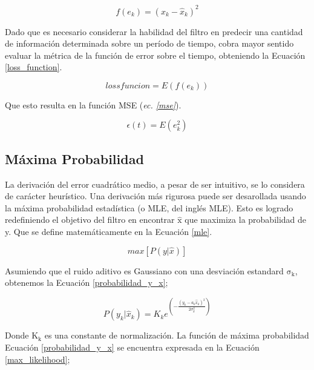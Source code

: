 \documentclass[10pt,a4paper]{article}
\begin{document}
\begin{equation}
    f(e_k) = (x_k - \hat{x}_k)^2 \label{error_cuadratico}
\end{equation}

Dado que es necesario considerar la habilidad del filtro en predecir una
cantidad de informaci\'on determinada sobre un per\'iodo de tiempo, cobra mayor
sentido evaluar la m\'etrica de la funci\'on de error sobre el tiempo,
obteniendo la Ecuaci\'on \ref{loss_function}.

\begin{equation}
    lossfuncion = E\left(f(e_k)\right) \label{loss_function}
\end{equation}

Que esto resulta en la funci\'on \acrshort{MSE} (\emph{ec. \ref{mse}}).

\begin{equation}
    \epsilon(t) = E(e^2_k) \label{mse}
\end{equation}

\subsection{M\'axima Probabilidad}\label{maximum_likelihood_section}

La derivaci\'on del error cuadr\'atico medio, a pesar de ser intuitivo, se lo
considera de car\'acter heur\'istico. Una derivaci\'on m\'as rigurosa puede ser
desarollada usando la m\'axima probabilidad estad\'istica (o \acrshort{MLE}, del
ingl\'es \acrlong{MLE}). Esto es logrado redefiniendo el objetivo del filtro en
encontrar $\mathrm{\hat{x}}$ que maximiza la probabilidad de y. Que se define
matem\'aticamente en la Ecuaci\'on \ref{mle}.

\begin{equation}
    max\left[P\left(y|\hat{x}\right)\right] \label{mle}
\end{equation}

Asumiendo que el ruido aditivo es Gaussiano con una desviaci\'on estandard
$\mathrm{\sigma_k}$, obtenemos la Ecuaci\'on \ref{probabilidad_y_x};

\begin{equation}
    P\left(y_k|\hat{x}_k\right) = K_ke^{\left(- \frac{(y_k - a_k\hat{x}_k)^2}{2\sigma^2_k}\right)} \label{probabilidad_y_x}
\end{equation}

Donde $\mathrm{K_k}$ es una constante de normalizaci\'on. La funci\'on de
m\'axima probabilidad Ecuaci\'on \ref{probabilidad_y_x} se encuentra expresada
en la Ecuaci\'on \ref{max_likelihood};
\end{document}
